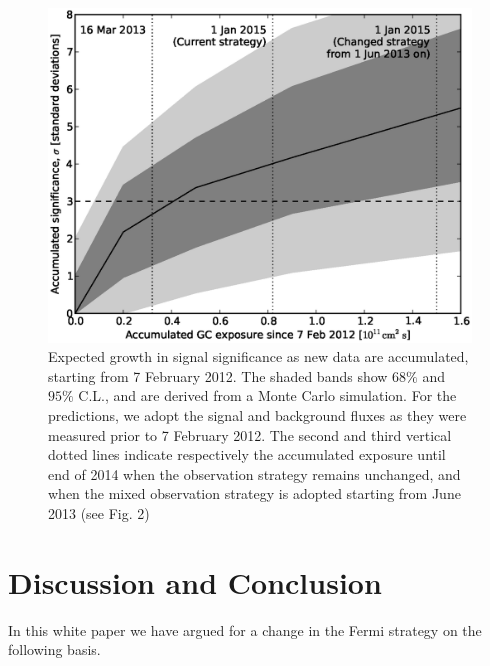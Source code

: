 \documentclass[aps,prd,superscriptaddress,showpacs]{revtex4}
\begin{document}
\begin{figure}[h]
  \begin{center}
    \includegraphics[width=0.8\linewidth]{plots/projection.eps}
    \vspace{-0.5cm}
  \end{center}
  \caption{Expected growth in signal significance as new data are accumulated,
    starting from 7 February 2012. The shaded bands show $68\%$ and $95\%$
    C.L., and are derived from a Monte Carlo simulation. For the predictions,
    we adopt the signal and background fluxes as they were measured prior to 7
    February 2012. The second and third vertical dotted lines indicate
    respectively the accumulated exposure until end of 2014 when the
    observation strategy remains unchanged, and when the mixed observation
    strategy is adopted starting from June 2013 (see Fig. 2)}
  \label{fig:projection}
\end{figure}




\section{Discussion and Conclusion}
\label{sec:Conclusion}

In this white paper we have argued for a change in the Fermi strategy on the
following basis.
\end{document}
